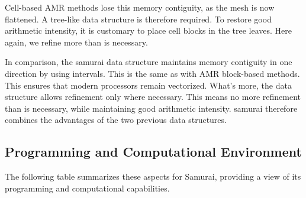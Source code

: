 Cell-based AMR methods lose this memory contiguity, as the mesh is now flattened. A tree-like data structure is therefore required. To restore good arithmetic intensity, it is customary to place cell blocks in the tree leaves. Here again, we refine more than is necessary.

In comparison, the samurai data structure maintains memory contiguity in one direction by using intervals. This is the same as with AMR block-based methods. This ensures that modern processors remain vectorized. What's more, the data structure allows refinement only where necessary. This means no more refinement than is necessary, while maintaining good arithmetic intensity. samurai therefore combines the advantages of the two previous data structures.

\subsection{Programming and Computational Environment}
\label{sec::Samurai:environment_capabilities}


The following table summarizes these aspects for Samurai, providing a  view of its programming and computational capabilities.

